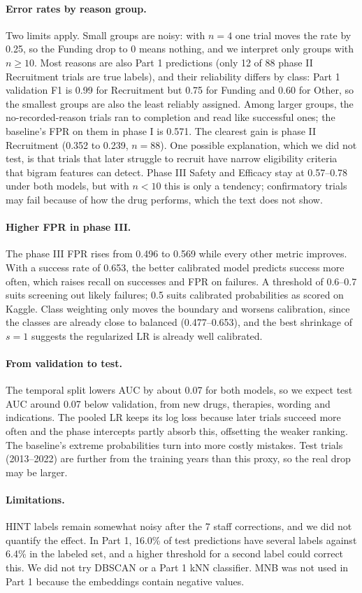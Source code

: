 \paragraph{Error rates by reason group.}
Two limits apply.
Small groups are noisy: with $n=4$ one trial moves the rate by 0.25, so the Funding drop to 0 means nothing, and we interpret only groups with $n\ge 10$.
Most reasons are also Part 1 predictions (only 12 of 88 phase II Recruitment trials are true labels), and their reliability differs by class: Part 1 validation F1 is 0.99 for Recruitment but 0.75 for Funding and 0.60 for Other, so the smallest groups are also the least reliably assigned.
Among larger groups, the no-recorded-reason trials ran to completion and read like successful ones; the baseline's FPR on them in phase I is 0.571.
The clearest gain is phase II Recruitment (0.352 to 0.239, $n=88$).
One possible explanation, which we did not test, is that trials that later struggle to recruit have narrow eligibility criteria that bigram features can detect.
Phase III Safety and Efficacy stay at 0.57--0.78 under both models, but with $n<10$ this is only a tendency; confirmatory trials may fail because of how the drug performs, which the text does not show.

\paragraph{Higher FPR in phase III.}
The phase III FPR rises from 0.496 to 0.569 while every other metric improves.
With a success rate of 0.653, the better calibrated model predicts success more often, which raises recall on successes and FPR on failures.
A threshold of 0.6--0.7 suits screening out likely failures; 0.5 suits calibrated probabilities as scored on Kaggle.
Class weighting only moves the boundary and worsens calibration, since the classes are already close to balanced (0.477--0.653), and the best shrinkage of $s=1$ suggests the regularized LR is already well calibrated.

\paragraph{From validation to test.}
The temporal split lowers AUC by about 0.07 for both models, so we expect test AUC around 0.07 below validation, from new drugs, therapies, wording and indications.
The pooled LR keeps its log loss because later trials succeed more often and the phase intercepts partly absorb this, offsetting the weaker ranking.
The baseline's extreme probabilities turn into more costly mistakes.
Test trials (2013--2022) are further from the training years than this proxy, so the real drop may be larger.

\paragraph{Limitations.}
HINT labels remain somewhat noisy after the 7 staff corrections, and we did not quantify the effect.
In Part 1, 16.0\% of test predictions have several labels against 6.4\% in the labeled set, and a higher threshold for a second label could correct this.
We did not try DBSCAN or a Part 1 kNN classifier.
MNB was not used in Part 1 because the embeddings contain negative values.
